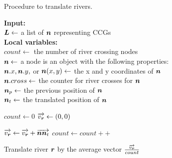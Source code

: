 \begin{algorithm}[tb!]
    \caption{Procedure to translate rivers.}\label{alg:TranslateRiver}
    \textbf{Input:} \\
    $ \bm{L} \gets $ a list of $ \bm{n} $ representing CCGs \\

    \textbf{Local variables:} \\
    $ count \gets $ the number of river crossing nodes \\
    $ \bm{n} \gets $ a node is an object with the following properties: \\
    \-\hspace{1em} $ \bm{n}.x, \bm{n}.y, $ or $ \bm{n}(x,y) \gets $ the x and y coordinates of $ \bm{n} $ \\
    \-\hspace{1em} $ \bm{n}.cross \gets $ the counter for river crosses for $ \bm{n} $ \\
    \-\hspace{1em} $ \bm{n}_{p} \gets $ the previous position of $ \bm{n} $ \\
    \-\hspace{1em} $ \bm{n}_t \gets $ the translated position of $ \bm{n} $ \\

    \begin{algorithmic}[1]
        \ForEach {$ \river \in \riverList $}
        \State $ count \gets 0 $
        \State $ \protect\overrightarrow{v_{\bm{r}}} \gets (0,0) $ 
        \ForEach {$ \node \in \nodeList $}

        \State $ \protect\overrightarrow{v_{\bm{r}}} \gets \protect\overrightarrow{v_{\bm{r}}} + \protect\overrightarrow{\bm{n}\bm{n}_t}$
        \State $ count \gets count ++ $
        \EndIf

        \EndIf

        \EndFor

        \State Translate river $ \bm{r} $ by the average vector $ \frac{\protect\overrightarrow{v_{\bm{r}}}}{count} $
        \EndFor

        \EndProcedure
    \end{algorithmic}
\end{algorithm}



